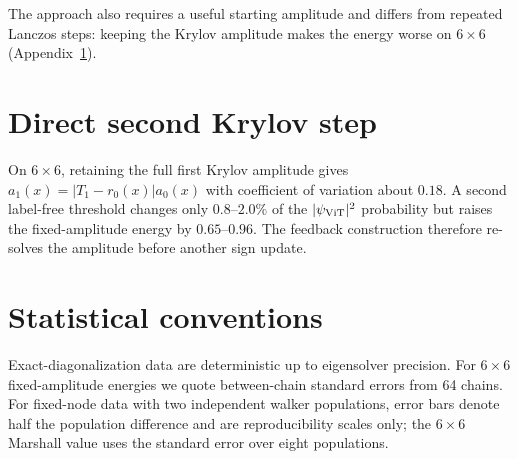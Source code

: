 \documentclass[aps,prb,reprint,onecolumn,superscriptaddress,floatfix]{revtex4-2}
\begin{document}
The approach also requires a useful starting amplitude and differs from
repeated Lanczos steps: keeping the Krylov amplitude makes the energy worse
on $6\times6$ (Appendix~\ref{app:k2}).

\appendix

\section{Direct second Krylov step}
\label{app:k2}

On $6\times6$, retaining the full first Krylov amplitude gives
$a_1(x)=|T_1-r_0(x)|a_0(x)$ with coefficient of variation about $0.18$.
A second label-free threshold changes only $0.8$--$2.0\%$ of the
$|\psi_{\rm ViT}|^2$ probability but raises the fixed-amplitude energy by
$0.65$--$0.96$. The feedback construction therefore re-solves the amplitude
before another sign update.

\section{Statistical conventions}
\label{app:stats}

Exact-diagonalization data are deterministic up to eigensolver precision.
For $6\times6$ fixed-amplitude energies we quote between-chain standard
errors from 64 chains. For fixed-node data with two independent walker
populations, error bars denote half the population difference and are
reproducibility scales only; the $6\times6$ Marshall value uses the standard
error over eight populations.


\end{document}
